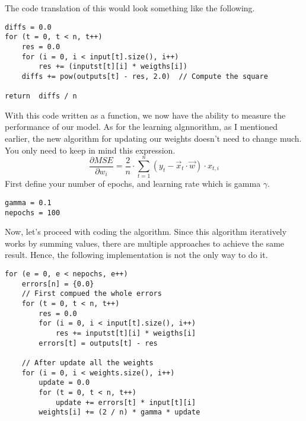 The code translation of this would look something like the following.
\begin{verbatim}
diffs = 0.0
for (t = 0, t < n, t++)
    res = 0.0
    for (i = 0, i < input[t].size(), i++)
        res += (inputst[t][i] * weigths[i])
    diffs += pow(outputs[t] - res, 2.0)  // Compute the square

return  diffs / n
\end{verbatim}
With this code written as a function, we now have the ability to measure the performance of our model.
As for the learning algnnorithm, as I mentioned earlier, the new algorithm for updating our weights doesn't
need to change much. You only need to keep in mind this expression.
\[
\frac{\partial MSE}{\partial w_i} = \frac{2}{n} \cdot \sum_{t = 1}^n(y_t - \vec{x}_t \cdot \vec{w}) \cdot x_{t, i}
\]
First define your number of epochs, and learning rate which is gamma $\gamma$.
\begin{verbatim}
gamma = 0.1
nepochs = 100
\end{verbatim}
Now, let's proceed with coding the algorithm. Since this algorithm iteratively works by summing values,
there are multiple approaches to achieve the same result. Hence, the following implementation is not the
only way to do it.
\begin{verbatim}
for (e = 0, e < nepochs, e++)
    errors[n] = {0.0}
    // First compued the whole errors
    for (t = 0, t < n, t++)
        res = 0.0
        for (i = 0, i < input[t].size(), i++)
            res += inputst[t][i] * weigths[i]
        errors[t] = outputs[t] - res

    // After update all the weights
    for (i = 0, i < weights.size(), i++)
        update = 0.0
        for (t = 0, t < n, t++)
            update += errors[t] * input[t][i]
        weights[i] += (2 / n) * gamma * update
\end{verbatim}

